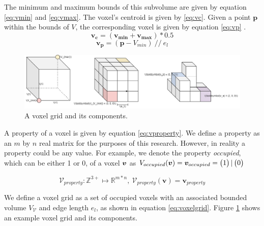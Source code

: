 The minimum and maximum bounds of this subvolume are given by equation \ref{eq:vmin} and \ref{eq:vmax}. The voxel's centroid is given by \ref{eq:vc}. Given a point \(\boldsymbol{p}\) within the bounds of \(V\), the corresponding voxel is given by equation \ref{eq:vp} . 
\begin{equation}
    \label{eq:vc}
    \boldsymbol{v_c} = (\boldsymbol{v_{min}} + \boldsymbol{v_{max}})*0.5
\end{equation}
\begin{equation}
    \label{eq:vp}
    \boldsymbol{v_p} = (\boldsymbol{p} - V_{min})\ //\ e_l
\end{equation}



\begin{figure}[h]
    \centering
    \includegraphics*[width=\textwidth]{./fig/voxels_basic.png}
    \caption{A voxel grid and its components.}
    \label{fig:vg_basic}
\end{figure}

A property of a voxel is given by equation \ref{eq:vproperty}. We define a property as an \(m\) by \(n\) real matrix for the purposes of this research. However, in reality a property could be any value. For example, we denote the property \textit{occupied}, which can be either 1 or 0, of a voxel \(\boldsymbol{v}\) as \(V_{occupied}(\boldsymbol{v}) = \boldsymbol{v}_{occupied} = \begin{pmatrix} 1 \end{pmatrix} | \begin{pmatrix} 0 \end{pmatrix}\)

\begin{equation}
    \label{eq:vproperty}
    \mathcal{V}_{property}: \mathbb{Z}^{3+} \mapsto \mathbb{R}^{m*n},\ \mathcal{V}_{property}(\boldsymbol{v}) = \boldsymbol{v}_{property}
\end{equation}

We define a voxel grid as a set of occupied voxels with an associated bounded volume \(V_{\mathcal{V}}\) and edge length \(e_{l}\), as shown in equation \ref{eq:voxelgrid}. Figure \ref{fig:vg_basic} shows an example voxel grid and its components.

